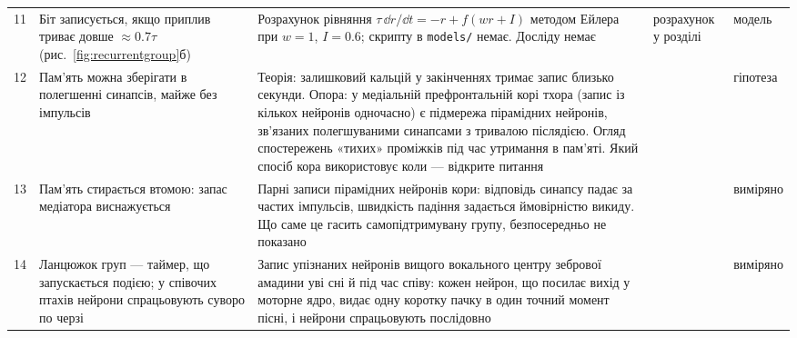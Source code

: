 {\begin{longtable}{>{\raggedright}p{0.5cm}>{\raggedright}p{4.0cm}>{\raggedright}p{5.6cm}>{\raggedright}p{2.3cm}>{\raggedright\arraybackslash}p{1.7cm}}
11 & Біт записується, якщо приплив триває довше $\approx0.7\tau$ (рис.~\ref{fig:recurrentgroup}б) & Розрахунок рівняння $\tau\,\dd r/\dd t=-r+f(wr+I)$ методом Ейлера при $w=1$, $I=0.6$; скрипту в \texttt{models/} немає. Досліду немає & розрахунок у розділі & модель \\
12 & Пам'ять можна зберігати в полегшенні синапсів, майже без імпульсів & Теорія: залишковий кальцій у закінченнях тримає запис близько секунди. Опора: у медіальній префронтальній корі тхора (запис із кількох нейронів одночасно) є підмережа пірамідних нейронів, зв'язаних полегшуваними синапсами з тривалою післядією. Огляд спостережень «тихих» проміжків під час утримання в пам'яті. Який спосіб кора використовує коли --- відкрите питання & \cite{Mongillo2008,WangMarkram2006,Stokes2015} & гіпотеза \\
13 & Пам'ять стирається втомою: запас медіатора виснажується & Парні записи пірамідних нейронів кори: відповідь синапсу падає за частих імпульсів, швидкість падіння задається ймовірністю викиду. Що саме це гасить самопідтримувану групу, безпосередньо не показано & \cite{Tsodyks1997} & виміряно \\
14 & Ланцюжок груп --- таймер, що запускається подією; у співочих птахів нейрони спрацьовують суворо по черзі & Запис упізнаних нейронів вищого вокального центру зебрової амадини уві сні й під час співу: кожен нейрон, що посилає вихід у моторне ядро, видає одну коротку пачку в один точний момент пісні, і нейрони спрацьовують послідовно & \cite{Hahnloser2002} & виміряно \\
\bottomrule
\end{longtable}}
